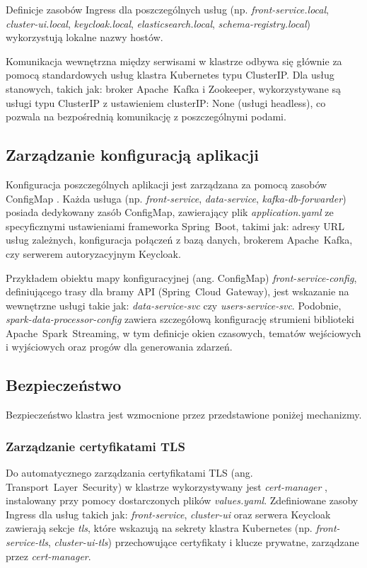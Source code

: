 Definicje zasobów Ingress dla poszczególnych usług (np. \textit{front-service.local}, \textit{cluster-ui.local}, \textit{keycloak.local}, \textit{elasticsearch.local}, \textit{schema-registry.local}) wykorzystują lokalne nazwy hostów.

Komunikacja wewnętrzna między serwisami w klastrze odbywa się głównie za pomocą standardowych usług klastra Kubernetes typu ClusterIP. Dla usług stanowych, takich jak: broker \mbox{Apache Kafka} i Zookeeper, wykorzystywane są usługi typu ClusterIP z ustawieniem clusterIP: None (usługi headless), co pozwala na bezpośrednią komunikację z poszczególnymi podami.

\subsection{Zarządzanie konfiguracją aplikacji} 

Konfiguracja poszczególnych aplikacji jest zarządzana za pomocą zasobów ConfigMap \cite{kubernetes_configmap_docs}. Każda usługa (np. \textit{front-service}, \textit{data-service}, \textit{kafka-db-forwarder}) posiada dedykowany zasób \mbox{ConfigMap}, zawierający plik \textit{application.yaml} ze specyficznymi ustawieniami frameworka \mbox{Spring Boot}, takimi jak: adresy URL usług zależnych, konfiguracja połączeń z bazą danych, brokerem \mbox{Apache Kafka}, czy serwerem autoryzacyjnym Keycloak.

Przykładem obiektu mapy konfiguracyjnej (ang. \mbox{ConfigMap}) \textit{front-service-config}, definiującego trasy dla bramy API (\mbox{Spring Cloud Gateway}), jest wskazanie na wewnętrzne usługi takie jak: \textit{data-service-svc} czy \textit{users-service-svc}. Podobnie, \textit{spark-data-processor-config} zawiera szczegółową konfigurację strumieni biblioteki \mbox{Apache Spark Streaming}, w tym definicje okien czasowych, tematów wejściowych i wyjściowych oraz progów dla generowania zdarzeń.

\subsection{Bezpieczeństwo}

Bezpieczeństwo klastra jest wzmocnione przez przedstawione poniżej mechanizmy.

\subsubsection{Zarządzanie certyfikatami TLS}
Do automatycznego zarządzania certyfikatami TLS (ang. \mbox{Transport Layer Security}) w klastrze wykorzystywany jest \textit{cert-manager} \cite{cert_manager_docs}, instalowany przy pomocy dostarczonych plików \textit{values.yaml}. Zdefiniowane zasoby Ingress dla usług takich jak: \textit{front-service}, \textit{cluster-ui} oraz serwera Keycloak zawierają sekcje \textit{tls}, które wskazują na sekrety klastra Kubernetes (np. \textit{front-service-tls}, \textit{cluster-ui-tls}) przechowujące certyfikaty i klucze prywatne, zarządzane przez \textit{cert-manager}.


